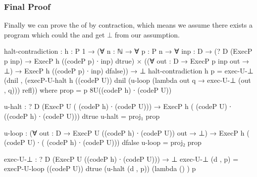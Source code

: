 \subsubsection{Final Proof}
Finally we can prove the  of  by contraction, which means we assume there exists a program  which could  the  and get $\bot$ from our assumption.
\begin{code}[fontsize=\small]
halt-contradiction : {h : P 1}
                   → (∀ {n : ℕ} → ∀ {p : P n} → ∀ {inp : D}
                      → (? D (ExecP p inp) 
			  → ExecP h ((codeP p) ∙ inp) dtrue)
                      ×  ((∀ {out : D} → ExecP p inp out → ⊥) 
			  → ExecP h ((codeP p) ∙ inp) dfalse))
                   → ⊥
halt-contradiction {h} p = exec-U-⊥ (dnil , 
				      (execP-U-halt {h} ((codeP U)) dnil 
				        (u-loop 
					  (lambda {out} q 
					      → exec-U-⊥ (out , q))) 
					refl))
  where
    prop = p {8}{U}{((codeP h) ∙ (codeP U))}
    
    u-halt : ? D (ExecP U ( (codeP h) ∙ (codeP U))) 
	→ ExecP h ( (codeP U) ∙ ((codeP h) ∙ (codeP U))) dtrue
    u-halt = proj₁ prop

    u-loop : (∀ {out : D} → ExecP U ((codeP h) ∙  (codeP U)) out → ⊥) 
	→ ExecP h ( (codeP U) ∙ ( (codeP h) ∙  (codeP U))) dfalse
    u-loop = proj₂ prop

    exec-U-⊥ : ? D (ExecP U ((codeP h) ∙ (codeP U))) → ⊥
    exec-U-⊥ (d , p) = execP-U-loop ((codeP U)) dtrue 
			(u-halt (d , p)) (lambda { () }) p
\end{code}
